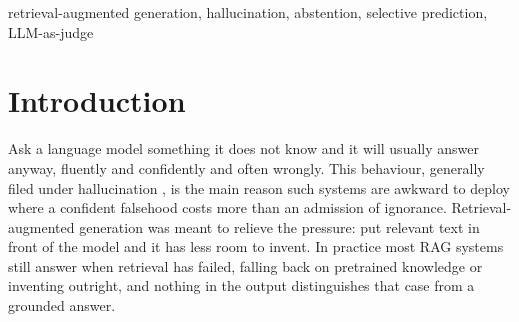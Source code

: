 \documentclass[conference]{IEEEtran}
\begin{document}
\begin{abstract}
Retrieval-augmented generation (RAG) hallucinates less than a bare language model, but most deployed systems still answer even when retrieval returns nothing useful. A common remedy is to gate generation on retrieval confidence: average the similarity of the retrieved passages and refuse when that average falls below a threshold. We study where this stops working. Our corpus is 62 Wikipedia pages on the Indian Premier League split into 2{,}732 passages, and our query set is 160 questions hand-labelled for answerability: 18 unrelated to cricket, and 35 \emph{near-miss} questions that sound like plausible IPL questions the corpus cannot answer. The gate handles the first group perfectly and the second badly. Out-of-domain questions score 0.135--0.336 and are refused every time; near-miss questions score 0.462--0.715 and sit inside the answerable range (0.517--0.824), so 74 of our 90 answerable questions score no higher than the best near-miss. No threshold separates them. At $\tau^\ast = 0.62$, selected by maximising abstention F1, the mechanism reaches F1 = 0.77 and MCC = 0.65 against a chance-matched baseline of 0.35 and 0.00, but recall on unanswerable questions is only 0.72. Faithfulness rises from 2.19 to 4.44 out of 5 against a no-context baseline and the hallucination rate falls from 99/160 to 7/84. Two methodological findings also emerged: the judge scores the identical refusal \texttt{"I don't know."} as faithfulness 1, 3 and 5 at temperature zero, forcing refusals out of any meaningful hallucination rate; and against 15 hand-scored items it agrees substantially with a human rater ($r = 0.83$ and $0.85$).
\end{abstract}

\begin{IEEEkeywords}
retrieval-augmented generation, hallucination, abstention, selective prediction, LLM-as-judge
\end{IEEEkeywords}

\section{Introduction}

Ask a language model something it does not know and it will usually answer anyway, fluently and confidently and often wrongly. This behaviour, generally filed under hallucination \cite{ji2023survey}, is the main reason such systems are awkward to deploy where a confident falsehood costs more than an admission of ignorance. Retrieval-augmented generation \cite{lewis2020rag} was meant to relieve the pressure: put relevant text in front of the model and it has less room to invent. In practice most RAG systems still answer when retrieval has failed, falling back on pretrained knowledge or inventing outright, and nothing in the output distinguishes that case from a grounded answer.
\end{document}
